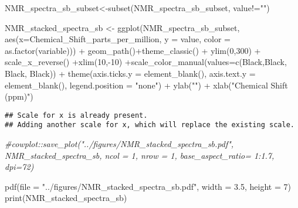 \documentclass[
]{article}
\newenvironment{Shaded}{\begin{snugshade}}{\end{snugshade}}
\newcommand{\AttributeTok}[1]{\textcolor[rgb]{0.77,0.63,0.00}{#1}}
\newcommand{\CommentTok}[1]{\textcolor[rgb]{0.56,0.35,0.01}{\textit{#1}}}
\newcommand{\DecValTok}[1]{\textcolor[rgb]{0.00,0.00,0.81}{#1}}
\newcommand{\FloatTok}[1]{\textcolor[rgb]{0.00,0.00,0.81}{#1}}
\newcommand{\FunctionTok}[1]{\textcolor[rgb]{0.00,0.00,0.00}{#1}}
\newcommand{\NormalTok}[1]{#1}
\newcommand{\OtherTok}[1]{\textcolor[rgb]{0.56,0.35,0.01}{#1}}
\newcommand{\SpecialCharTok}[1]{\textcolor[rgb]{0.00,0.00,0.00}{#1}}
\newcommand{\StringTok}[1]{\textcolor[rgb]{0.31,0.60,0.02}{#1}}
\begin{document}
\begin{Shaded}
\begin{Highlighting}[]
\NormalTok{NMR\_spectra\_sb\_subset}\OtherTok{\textless{}{-}}\FunctionTok{subset}\NormalTok{(NMR\_spectra\_sb\_subset, value}\SpecialCharTok{!=}\StringTok{""}\NormalTok{)}

\NormalTok{NMR\_stacked\_spectra\_sb }\OtherTok{\textless{}{-}} \FunctionTok{ggplot}\NormalTok{(NMR\_spectra\_sb\_subset, }\FunctionTok{aes}\NormalTok{(}\AttributeTok{x=}\NormalTok{Chemical\_Shift\_parts\_per\_million, }\AttributeTok{y =}\NormalTok{ value, }\AttributeTok{color =} \FunctionTok{as.factor}\NormalTok{(variable))) }\SpecialCharTok{+} \FunctionTok{geom\_path}\NormalTok{()}\SpecialCharTok{+}\FunctionTok{theme\_classic}\NormalTok{() }\SpecialCharTok{+} \FunctionTok{ylim}\NormalTok{(}\DecValTok{0}\NormalTok{,}\DecValTok{300}\NormalTok{) }\SpecialCharTok{+} \FunctionTok{scale\_x\_reverse}\NormalTok{() }\SpecialCharTok{+}\FunctionTok{xlim}\NormalTok{(}\DecValTok{10}\NormalTok{,}\SpecialCharTok{{-}}\DecValTok{10}\NormalTok{) }\SpecialCharTok{+}\FunctionTok{scale\_color\_manual}\NormalTok{(}\AttributeTok{values=}\FunctionTok{c}\NormalTok{(}\StringTok{\textquotesingle{}Black\textquotesingle{}}\NormalTok{,}\StringTok{\textquotesingle{}Black\textquotesingle{}}\NormalTok{, }\StringTok{\textquotesingle{}Black\textquotesingle{}}\NormalTok{, }\StringTok{\textquotesingle{}Black\textquotesingle{}}\NormalTok{)) }\SpecialCharTok{+} \FunctionTok{theme}\NormalTok{(}\AttributeTok{axis.ticks.y =} \FunctionTok{element\_blank}\NormalTok{(),  }\AttributeTok{axis.text.y =} \FunctionTok{element\_blank}\NormalTok{(), }\AttributeTok{legend.position =} \StringTok{"none"}\NormalTok{)  }\SpecialCharTok{+} \FunctionTok{ylab}\NormalTok{(}\StringTok{""}\NormalTok{) }\SpecialCharTok{+} \FunctionTok{xlab}\NormalTok{(}\StringTok{"Chemical Shift (ppm)"}\NormalTok{)}
\end{Highlighting}
\end{Shaded}

\begin{verbatim}
## Scale for x is already present.
## Adding another scale for x, which will replace the existing scale.
\end{verbatim}

\begin{Shaded}
\begin{Highlighting}[]
\CommentTok{\#cowplot::save\_plot("../figures/NMR\_stacked\_spectra\_sb.pdf", NMR\_stacked\_spectra\_sb, ncol = 1, nrow = 1, base\_aspect\_ratio= 1:1.7, dpi=72)}

\FunctionTok{pdf}\NormalTok{(}\AttributeTok{file =} \StringTok{"../figures/NMR\_stacked\_spectra\_sb.pdf"}\NormalTok{, }\AttributeTok{width =} \FloatTok{3.5}\NormalTok{, }\AttributeTok{height =} \DecValTok{7}\NormalTok{) }
\FunctionTok{print}\NormalTok{(NMR\_stacked\_spectra\_sb)}
\end{Highlighting}
\end{Shaded}
\end{document}
